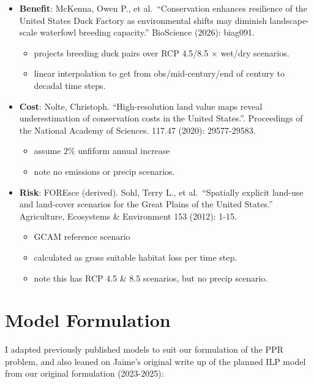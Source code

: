 \documentclass[
  letterpaper,
  DIV=11,
  numbers=noendperiod]{scrartcl}
\providecommand{\tightlist}{%
  \setlength{\itemsep}{0pt}\setlength{\parskip}{0pt}}
\begin{document}
\begin{itemize}
\tightlist
\item
  \textbf{Benefit}: McKenna, Owen P., et al.~``Conservation enhances
  resilience of the United States Duck Factory as environmental shifts
  may diminish landscape-scale waterfowl breeding capacity.'' BioScience
  (2026): biag091.

  \begin{itemize}
  \tightlist
  \item
    projects breeding duck pairs over RCP 4.5/8.5 × wet/dry scenarios.
  \item
    linear interpolation to get from obs/mid-century/end of century to
    decadal time steps.
  \end{itemize}
\item
  \textbf{Cost}: Nolte, Christoph. ``High-resolution land value maps
  reveal underestimation of conservation costs in the United States.''.
  Proceedings of the National Academy of Sciences. 117.47 (2020):
  29577-29583.

  \begin{itemize}
  \tightlist
  \item
    assume 2\% unfiform annual increase
  \item
    note no emissions or precip scenarios.
  \end{itemize}
\item
  \textbf{Risk}: FOREsce (derived). Sohl, Terry L., et al.~``Spatially
  explicit land-use and land-cover scenarios for the Great Plains of the
  United States.'' Agriculture, Ecosystems \& Environment 153 (2012):
  1-15.

  \begin{itemize}
  \tightlist
  \item
    GCAM reference scenario
  \item
    calculated as gross suitable habitat loss per time step.
  \item
    note this has RCP 4.5 \& 8.5 scenarios, but no precip scenario.
  \end{itemize}
\end{itemize}

\section{Model Formulation}\label{model-formulation}

I adapted previously published models to suit our formulation of the PPR
problem, and also leaned on Jaime's original write up of the planned ILP
model from our original formulation (2023-2025):
\end{document}
